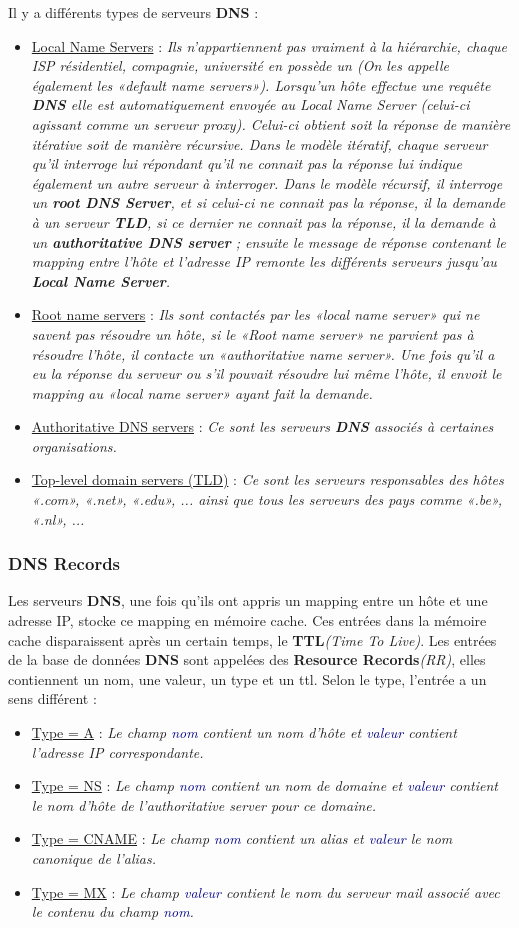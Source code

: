 \documentclass{article}
\newcommand{\blu}[1]{\textcolor{darkblue}{#1}}
\newcommand{\ora}[1]{\textcolor{darko}{#1}}
\newcommand{\point}[2]{\item \ora{\underline{#1}} : \textit{#2}}
\begin{document}
Il y a différents types de serveurs \textbf{DNS} :
\begin{itemize}
\point{Local Name Servers}{Ils n'appartiennent pas vraiment à la hiérarchie, chaque ISP résidentiel, compagnie,
université en possède un (On les appelle également les «default name servers»). Lorsqu'un hôte effectue une 
requête \textbf{DNS} elle est automatiquement envoyée au Local Name Server (celui-ci agissant comme un serveur
proxy). Celui-ci obtient soit la réponse de manière itérative soit de manière récursive. Dans le modèle 
itératif, chaque serveur qu'il interroge lui répondant qu'il ne connait pas la réponse lui indique également un
autre serveur à interroger. Dans le modèle récursif, il interroge un \textbf{root DNS Server}, et si celui-ci ne 
connait pas la réponse, il la demande à un serveur \textbf{TLD}, si ce dernier ne connait pas la réponse, il la
demande à un \textbf{authoritative DNS server} ; ensuite le message de réponse contenant le mapping entre l'hôte
et l'adresse IP remonte les différents serveurs jusqu'au \textbf{Local Name Server}.}
\point{Root name servers}{Ils sont contactés par les «local name server» qui ne savent pas résoudre un hôte, si 
le «Root name server» ne parvient pas à résoudre l'hôte, il contacte un «authoritative name server». Une fois 
qu'il a eu la réponse du serveur ou s'il pouvait résoudre lui même l'hôte, il envoit le mapping au «local name 
server» ayant fait la demande.}
\point{Authoritative DNS servers}{Ce sont les serveurs \textbf{DNS} associés à certaines organisations.}
\point{Top-level domain servers (TLD)}{Ce sont les serveurs responsables des hôtes «.com», «.net», «.edu», ... 
ainsi que tous les serveurs des pays comme «.be», «.nl», ...}
\end{itemize}

\subsubsection{DNS Records}

Les serveurs \textbf{DNS}, une fois qu'ils ont appris un mapping entre un hôte et une adresse IP, stocke ce 
mapping en mémoire cache. Ces entrées dans la mémoire cache disparaissent après un certain temps, le 
\textbf{TTL}\textit{(Time To Live)}. Les entrées de la base de données \textbf{DNS} sont appelées des 
\textbf{Resource Records}\textit{(RR)}, elles contiennent un nom, une valeur, un type et un ttl. Selon le type,
l'entrée a un sens différent : \\
\begin{itemize}
\point{Type = A}{Le champ \blu{nom} contient un nom d'hôte et \blu{valeur} contient l'adresse IP correspondante.}
\point{Type = NS}{Le champ \blu{nom} contient un nom de domaine et \blu{valeur} contient le nom d'hôte de 
l'authoritative server pour ce domaine.}
\point{Type = CNAME}{Le champ \blu{nom} contient un alias et \blu{valeur} le nom canonique de l'alias.}
\point{Type = MX}{Le champ \blu{valeur} contient le nom du serveur mail associé avec le contenu du champ
\blu{nom}.}
\end{itemize}
\end{document}
